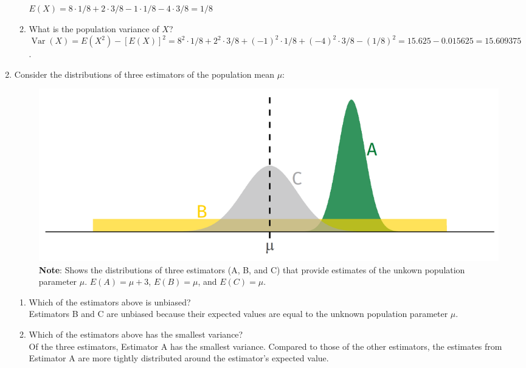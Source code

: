\documentclass[11pt]{article}
\begin{document}
\begin{onehalfspacing}
\begin{enumerate}
\begin{enumerate}[label=(\alph*)]
	\textcolor{PineGreen} {$E(X) = 8 \cdot 1/8 + 2 \cdot 3/8 - 1 \cdot 1/8 - 4 \cdot 3/8 = 1/8$}\\
	\item What is the population variance of $X$?\\
	
	\textcolor{PineGreen}{ $\mathop{\text{Var}}(X) = E(X^2) - [E(X)]^2 = 8^2 \cdot 1/8 + 2^2 \cdot 3/8 + (-1)^2 \cdot 1/8 + (-4)^2 \cdot 3/8 - (1/8)^2 = 15.625 - 0.015625 = 15.609375$.}
	
\end{enumerate}

\bigskip

\item Consider the distributions of three estimators of the population mean $\mu$:

\begin{figure}[H]
	\centering
	\includegraphics[width=\textwidth]{estimators.png}
	\caption*{\textbf{Note}: Shows the distributions of three estimators (A, B, and C) that provide estimates of the unkown population parameter $\mu$. $E(A) = \mu + 3$,  $E(B) = \mu$, and  $E(C) = \mu$.}
\end{figure}

\begin{enumerate}[label=(\alph*)]
	\item Which of the estimators above is unbiased?\\
	
	\textcolor{PineGreen} {Estimators B and C are unbiased because their expected values are equal to the unknown population parameter $\mu$.}\\
	
	\item  Which of the estimators above has the smallest variance?\\
	
	
	\textcolor{PineGreen}{Of the three estimators, Estimator A has the smallest variance. Compared to those of the other estimators, the estimates from Estimator A are more tightly distributed around the estimator's expected value.}\\
	

\end{enumerate}
\end{enumerate}
\end{onehalfspacing}
\end{document}
